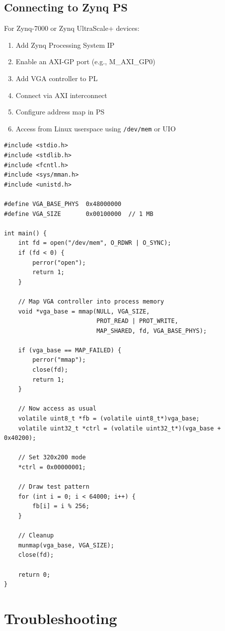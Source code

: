 \documentclass[11pt,letterpaper]{report}
\begin{document}
\section{Connecting to Zynq PS}

For Zynq-7000 or Zynq UltraScale+ devices:

\begin{enumerate}
    \item Add Zynq Processing System IP
    \item Enable an AXI-GP port (e.g., M\_AXI\_GP0)
    \item Add VGA controller to PL
    \item Connect via AXI interconnect
    \item Configure address map in PS
    \item Access from Linux userspace using \texttt{/dev/mem} or UIO
\end{enumerate}

\begin{lstlisting}[style=c,caption={Linux Userspace Access}]
#include <stdio.h>
#include <stdlib.h>
#include <fcntl.h>
#include <sys/mman.h>
#include <unistd.h>

#define VGA_BASE_PHYS  0x48000000
#define VGA_SIZE       0x00100000  // 1 MB

int main() {
    int fd = open("/dev/mem", O_RDWR | O_SYNC);
    if (fd < 0) {
        perror("open");
        return 1;
    }
    
    // Map VGA controller into process memory
    void *vga_base = mmap(NULL, VGA_SIZE, 
                          PROT_READ | PROT_WRITE, 
                          MAP_SHARED, fd, VGA_BASE_PHYS);
    
    if (vga_base == MAP_FAILED) {
        perror("mmap");
        close(fd);
        return 1;
    }
    
    // Now access as usual
    volatile uint8_t *fb = (volatile uint8_t*)vga_base;
    volatile uint32_t *ctrl = (volatile uint32_t*)(vga_base + 0x40200);
    
    // Set 320x200 mode
    *ctrl = 0x00000001;
    
    // Draw test pattern
    for (int i = 0; i < 64000; i++) {
        fb[i] = i % 256;
    }
    
    // Cleanup
    munmap(vga_base, VGA_SIZE);
    close(fd);
    
    return 0;
}
\end{lstlisting}

\chapter{Troubleshooting}
\label{ch:troubleshooting}
\end{document}
